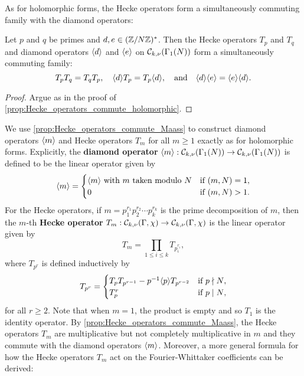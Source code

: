     As for holomorphic forms, the Hecke operators form a simultaneously commuting family with the diamond operators:

    \begin{proposition}\label{prop:Hecke_operators_commute_Maass}
      Let $p$ and $q$ be primes and $d,e \in (\mathbb{Z}/N\mathbb{Z})^{\ast}$. Then the Hecke operators $T_{p}$ and $T_{q}$ and diamond operators $\langle d\rangle$ and $\langle e\rangle$ on $\mathcal{C}_{k,\nu}(\Gamma_{1}(N))$ form a simultaneously commuting family:
      \[
        T_{p}T_{q} = T_{q}T_{p}, \quad \langle d\rangle T_{p} = T_{p}\langle d\rangle, \quad \text{and} \quad \langle d\rangle\langle e\rangle = \langle e\rangle\langle d\rangle.
      \]
    \end{proposition}
    \begin{proof}
      Argue as in the proof of \cref{prop:Hecke_operators_commute_holomorphic}.
    \end{proof}

    We use \cref{prop:Hecke_operators_commute_Maass} to construct diamond operators $\langle m\rangle$ and Hecke operators $T_{m}$ for all $m \ge 1$ exactly as for holomorphic forms. Explicitly, the \textbf{diamond operator} $\langle m\rangle:\mathcal{C}_{k,\nu}(\Gamma_{1}(N)) \to \mathcal{C}_{k,\nu}(\Gamma_{1}(N))$ is defined to be the linear operator given by
    \[
      \langle m\rangle = \begin{cases} \langle m\rangle \text{ with $m$ taken modulo $N$} & \text{if $(m,N) = 1$}, \\ 0 & \text{if $(m,N) > 1$}. \end{cases}
    \]
    For the Hecke operators, if $m = p_{1}^{r_{1}}p_{2}^{r_{2}} \cdots p_{k}^{r_{k}}$ is the prime decomposition of $m$, then the $m$-th \textbf{Hecke operator} $T_{m}:\mathcal{C}_{k,\nu}(\Gamma,\chi) \to \mathcal{C}_{k,\nu}(\Gamma,\chi)$ is the linear operator given by
    \[
      T_{m} = \prod_{1 \le i \le k}T_{p_{i}^{r_{i}}},
    \]
    where $T_{p^{r}}$ is defined inductively by
    \[
      T_{p^{r}} = \begin{cases} T_{p}T_{p^{r-1}}-p^{-1}\langle p\rangle T_{p^{r-2}} & \text{if $p \nmid N$}, \\ T_{p}^{r} & \text{if $p \mid N$}, \end{cases}
    \]
    for all $r \ge 2$. Note that when $m = 1$, the product is empty and so $T_{1}$ is the identity operator. By \cref{prop:Hecke_operators_commute_Maass}, the Hecke operators $T_{m}$ are multiplicative but not completely multiplicative in $m$ and they commute with the diamond operators $\langle m\rangle$. Moreover, a more general formula for how the Hecke operators $T_{m}$ act on the Fourier-Whittaker coefficients can be derived:

